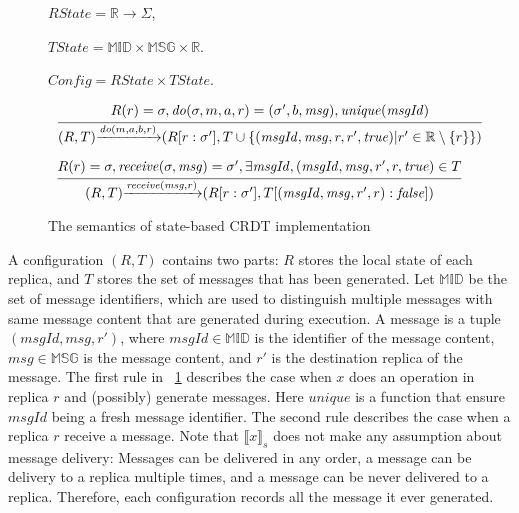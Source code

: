 \begin{figure}[ht]
$\mathit{RState} = \mathbb{R} \rightarrow \Sigma$,

$\mathit{TState} = \mathbb{MID} \times \mathbb{MSG} \times \mathbb{R}$.

$\mathit{Config} = \mathit{RState} \times \mathit{TState}$.


\[
\begin{array}{l c}
\bigfrac{ R(r) = \sigma, \mathit{do}(\sigma,m,a,r) = (\sigma',b,\mathit{msg}), \mathit{unique}(\mathit{msgId}) }
{ (R,T) {\xrightarrow{\mathit{do}(m,a,b,r)}} (R[r:\sigma'],T \cup \{ (\mathit{msgId},\mathit{msg},r,r',\mathit{true}) \vert r' \in \mathbb{R} \setminus \{ r \} \}) }
\end{array}
\]

\[
\begin{array}{l c}
\bigfrac{ R(r) = \sigma, \mathit{receive}(\sigma,\mathit{msg}) = \sigma', \exists \mathit{msgId},(\mathit{msgId},\mathit{msg},r',r,\mathit{true}) \in T }
{ (R,T) {\xrightarrow{\mathit{receive}(\mathit{msg},r)}} (R[r:\sigma'],T[(\mathit{msgId},\mathit{msg},r',r):\mathit{false}]) }
\end{array}
\]
\caption{The semantics of state-based CRDT implementation}
\label{fig:the semantics of state-based CRDT implementation}
\end{figure}


A configuration $(R,T)$ contains two parts: $R$ stores the local state of each replica, and $T$ stores the set of messages that has been generated. Let $\mathbb{MID}$ be the set of message identifiers, which are used to distinguish multiple messages with same message content that are generated during execution. A message is a tuple $(\mathit{msgId},\mathit{msg},r')$, where $\mathit{msgId} \in \mathbb{MID}$ is the identifier of the message content, $\mathit{msg} \in \mathbb{MSG}$ is the message content, and $r'$ is the destination replica of the message. The first rule in \figurename~\ref{fig:the semantics of state-based CRDT implementation} describes the case when $x$ does an operation in replica $r$ and (possibly) generate messages. Here $\mathit{unique}$ is a function that ensure $\mathit{msgId}$ being a fresh message identifier. The second rule describes the case when a replica $r$ receive a message. Note that $\llbracket x \rrbracket_{s}$ does not make any assumption about message delivery: Messages can be delivered in any order, a message can be delivery to a replica multiple times, and a message can be never delivered to a replica. Therefore, each configuration records all the message it ever generated.









